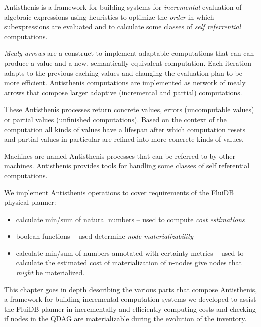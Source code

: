 

\begin{summary}
\item Antisthenis is a framework for building systems for
  \emph{incremental} evaluation of algebraic expressions using
  heuristics to optimize the \emph{order} in which subexpressions are
  evaluated and to calculate some classes of \emph{self referrential}
  computations.
\item \emph{Mealy arrows} are a construct to implement adaptable
  computations that can can produce a value and a new, semantically
  equivalent computation. Each iteration adapts to the previous
  caching values and changing the evaluation plan to be more
  efficient. Antisthenis computations are implemented as network of
  mealy arrows that compose larger adaptive (incremental and partial)
  computations.
\item These Antisthenis processes return concrete values, errors
  (uncomputable values) or partial values (unfinished
  computations). Based on the context of the computation all kinds of
  values have a lifespan after which computation resets and partial
  values in particular are refined into more concrete kinds of values.
\item Machines are named Antisthenis processes that can be referred to
  by other machines. Antisthenis provides tools for handling some
  classes of self referential computations.
\item We implement Antisthenis operations to cover requirements of the
  FluiDB physical planner:

  \begin{itemize}
  \item calculate min/sum of natural numbers -- used to compute
    \emph{cost estimations}
  \item boolean functions -- used determine \emph{node materializability}
  \item calculate min/sum of numbers annotated with certainty metrics
    -- used to calculate the estimated cost of materialization of
   n-nodes give nodes that \emph{might} be materialized.
  \end{itemize}
\end{summary}

This chapter goes in depth describing the various parts that compose
Antisthenis, a framework for building incremental computation systems
we developed to assist the FluiDB planner in incrementally and
efficiently computing costs and checking if nodes in the QDAG are
materializable during the evolution of the inventory.

